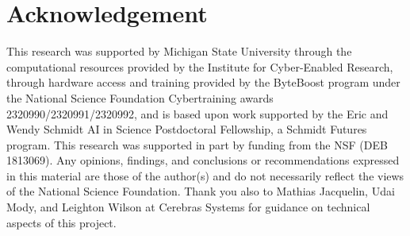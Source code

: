 \section*{Acknowledgement}

This research was supported by Michigan State University through the computational resources provided by the Institute for Cyber-Enabled Research, through hardware access and training provided by the ByteBoost program under the National Science Foundation Cybertraining awards 2320990/2320991/2320992, and is based upon work supported by the Eric and Wendy Schmidt AI in Science Postdoctoral Fellowship, a Schmidt Futures program.
This research was supported in part by funding from the NSF (DEB 1813069).
Any opinions, findings, and conclusions or recommendations expressed in this material are those of the author(s) and do not necessarily reflect the views of the National Science Foundation.
Thank you also to Mathias Jacquelin, Udai Mody, and Leighton Wilson at Cerebras Systems for guidance on technical aspects of this project.
